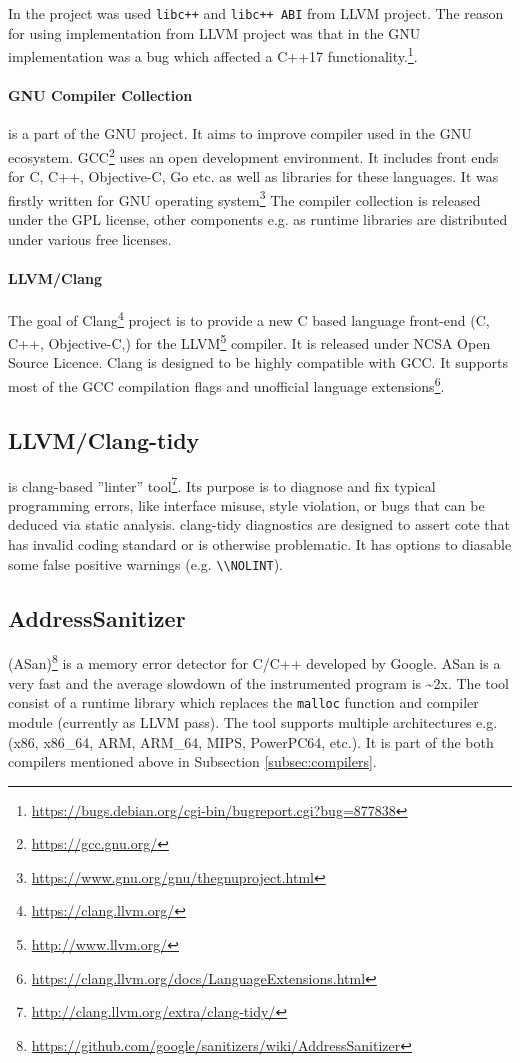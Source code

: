 In the project was used \texttt{libc++} and \texttt{libc++ ABI} from LLVM project.
The reason for using implementation from LLVM project was that in the GNU implementation
was a bug which affected a C++17 functionality.\footnote{\url{https://bugs.debian.org/cgi-bin/bugreport.cgi?bug=877838}}.

\paragraph{GNU Compiler Collection} is a part of the GNU project.
It aims to improve compiler used in the GNU ecosystem.
GCC\footnote{\url{https://gcc.gnu.org/}} uses an open development environment.
It includes front ends for C, C++, Objective-C, Go etc.
as well as libraries for these languages. It was firstly written for GNU operating system\footnote{\url{https://www.gnu.org/gnu/thegnuproject.html}}
The compiler collection is released under the GPL license, other components e.g. as runtime libraries are distributed under various free licenses.

\paragraph{LLVM/Clang}
The goal of Clang\footnote{\url{https://clang.llvm.org/}} project is to provide a new C based language front-end (C, C++, Objective-C,) for the LLVM\footnote{\url{http://www.llvm.org/}} compiler.
It is released under NCSA Open Source Licence. Clang is designed to be highly compatible with GCC.
It supports most of the GCC compilation flags and unofficial language extensions\footnote{\url{https://clang.llvm.org/docs/LanguageExtensions.html}}.

\subsection{LLVM/Clang-tidy} is clang-based ''linter'' tool\footnote{\url{http://clang.llvm.org/extra/clang-tidy/}}.
Its purpose is to diagnose and fix typical programming errors,
like interface misuse, style violation, or bugs that can be deduced via static analysis.
clang-tidy diagnostics are designed to assert cote that has invalid coding standard or is otherwise problematic.
It has options to diasable some false positive warnings (e.g. \texttt{\textbackslash\textbackslash NOLINT}).

\subsection{AddressSanitizer}
(ASan)\footnote{\url{https://github.com/google/sanitizers/wiki/AddressSanitizer}} is a memory error detector for C/C++ developed by Google.
ASan is a very fast and the average slowdown of the instrumented program is \textasciitilde 2x.
The tool consist of a runtime library which replaces the \texttt{malloc} function and compiler module (currently as LLVM pass).
The tool supports multiple architectures e.g. (x86, x86\_64, ARM, ARM\_64, MIPS, PowerPC64, etc.).
It is part of the both compilers mentioned above in Subsection \ref{subsec:compilers}.

